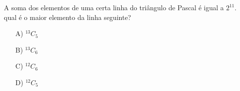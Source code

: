 A soma dos elementos de uma certa linha do triângulo de Pascal é igual a $2^11$. qual é o maior elemento da linha seguinte?
\begin{enumerate}
\item [A)] $^13C_5$
\item [B)] $^13C_6$
\item [C)] $^12C_6$
\item [D)] $^12C_5$
\end{enumerate}